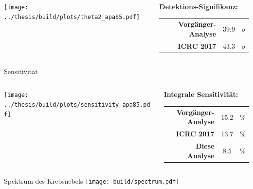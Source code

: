 \documentclass[aspectratio=1610, 9pt]{beamer}
\begin{document}
\begin{frame}[c]
  \begin{columns}[c, onlytextwidth]
    \begin{column}{0.65\textwidth}
      \texttt{[image: ../thesis/build/plots/theta2\_apa85.pdf]}%
    \end{column}
    \hfill%
    \begin{column}{0.3\textwidth}
      \large\bfseries Detektions-Signifikanz:
      \begin{tabular}{r S[table-format=2.1] @{\,} l}
        \bfseries\color{tugreen} Vorgänger-Analyse & 39.9 & $\sigma$ \\
        \bfseries\color{tugreen} ICRC 2017         & 43.3 & $\sigma$ \\
      \end{tabular}
    \end{column}
  \end{columns}
\end{frame}

\begin{frame}[c]{Sensitivität}
  \begin{columns}[c, onlytextwidth]
    \begin{column}{0.6\textwidth}
      \texttt{[image: ../thesis/build/plots/sensitivity\_apa85.pdf]}
    \end{column}
    \hfill%
    \begin{column}{0.35\textwidth}
      \large\bfseries Integrale Sensitivität:
      \begin{tabular}{r S[table-format=2.1] @{\,} l}
        \bfseries\color{tugreen} Vorgänger-Analyse & 15.2 & $\%$ \\
        \bfseries\color{tugreen} ICRC 2017         & 13.7 & $\%$ \\
        \bfseries\color{tugreen} Diese Analyse     &  8.5 & $\%$ \\
      \end{tabular}
    \end{column}
  \end{columns}
\end{frame}


\begin{frame}[t]{Spektrum des Krebsnebels}
  \centering
  \texttt{[image: build/spectrum.pdf]}
\end{frame}
\end{document}
